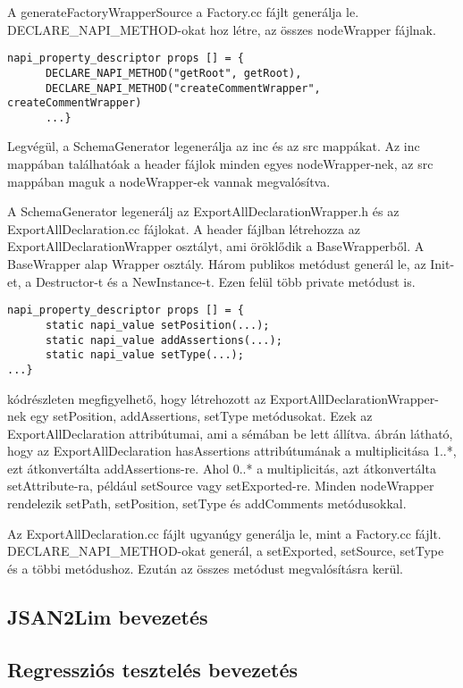 \noindent

A generateFactoryWrapperSource a Factory.cc fájlt generálja le.
DECLARE\_NAPI\_METHOD-okat hoz létre, az összes nodeWrapper fájlnak.

\begin{lstlisting}[caption={Factory.cc fájl}, label={lst:factory_cc}, language={CStyle}]
napi_property_descriptor props [] = {
      DECLARE_NAPI_METHOD("getRoot", getRoot),
      DECLARE_NAPI_METHOD("createCommentWrapper", createCommentWrapper)
      ...}
\end{lstlisting}

\noindent

Legvégül, a SchemaGenerator legenerálja az inc és az src mappákat.
Az inc mappában találhatóak a header fájlok minden egyes nodeWrapper-nek, az src mappában maguk a nodeWrapper-ek vannak megvalósítva.

\noindent

A SchemaGenerator legenerálj az ExportAllDeclarationWrapper.h és az ExportAllDeclaration.cc fájlokat.
A header fájlban létrehozza az ExportAllDeclarationWrapper osztályt, ami öröklődik a BaseWrapperből. A BaseWrapper alap Wrapper osztály.
Három publikos metódust generál le, az Init-et, a Destructor-t és a NewInstance-t.
Ezen felül több private metódust is.

\begin{lstlisting}[caption={ExportAllDeclarationWrapper.h fájl}, label={lst:ExportAllDeclarationWrapper_header}, language={CStyle}]
napi_property_descriptor props [] = {
      static napi_value setPosition(...);
      static napi_value addAssertions(...);
      static napi_value setType(...);
...}
\end{lstlisting}

 kódrészleten megfigyelhető, hogy létrehozott az ExportAllDeclarationWrapper-nek egy setPosition, addAssertions, setType metódusokat.
Ezek az ExportAllDeclaration attribútumai, ami a sémában be lett állítva.
 ábrán látható, hogy az ExportAllDeclaration hasAssertions attribútumának a multiplicitása 1..*, ezt átkonvertálta addAssertions-re.
Ahol 0..* a multiplicitás, azt átkonvertálta setAttribute-ra, például setSource vagy setExported-re.
Minden nodeWrapper rendelezik setPath, setPosition, setType és addComments metódusokkal.

\noindent

Az ExportAllDeclaration.cc fájlt ugyanúgy generálja le, mint a Factory.cc fájlt. DECLARE\_NAPI\_METHOD-okat generál, a setExported, setSource, setType és a többi metódushoz.
Ezután az összes metódust megvalósításra kerül.

\subsection{JSAN2Lim bevezetés}

\subsection{Regressziós tesztelés bevezetés}
